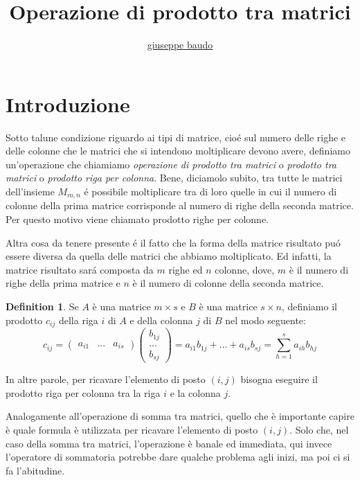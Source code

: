 \documentclass[a4paper,10pt]{article}
\title{Operazione di prodotto tra matrici}
\author{\href{http://www.baudo.hol.es}{giuseppe baudo}}
\begin{document}
	
	\theoremstyle{definition}
	\newtheorem{definition}{Definition}[section]

\maketitle

\section{Introduzione}
Sotto talune condizione riguardo ai tipi di matrice, cio\'{e} sul numero delle righe e delle colonne che le matrici che si intendono moltiplicare devono avere, definiamo un'operazione
che chiamiamo \textit{operazione di prodotto tra matrici} o \textit{prodotto tra matrici} o \textit{prodotto riga per colonna}.
Bene, diciamolo subito, tra tutte le matrici dell'insieme $M_{m,n}$ \'{e} possibile moltiplicare tra di loro quelle in cui il numero di colonne della prima matrice corrisponde al
numero di righe della seconda matrice. Per questo motivo viene chiamato prodotto righe per colonne.

Altra cosa da tenere presente \'{e} il fatto che la forma della matrice risultato pu\'{o} essere diversa da quella delle matrici che abbiamo moltiplicato. Ed infatti, la matrice risultato
sar\'{a} composta da $m$ righe ed $n$ colonne, dove, $m$ \`{e} il numero di righe della prima matrice e $n$ \`{e} il numero di colonne della seconda matrice.

\begin{definition}
 Se $A$ \`{e} una matrice $m \times s$ e $B$ \`{e} una matrice $s \times n$, definiamo il prodotto $c_{ij}$ della riga $i$ di $A$ e della colonna $j$ di $B$ nel modo seguente:
 \[
  c_{ij} = \begin{pmatrix}
	      a_{i1} & ... & a_{is}
           \end{pmatrix}           
           \begin{pmatrix}
	      b_{1j} \\
	      ... \\
	      b_{sj}
           \end{pmatrix}
         = a_{i1}b_{1j} + ... + a_{is}b_{sj}
         = \sum_{h=1}^s a_{ih}b_{hj}
 \]

\end{definition}

In altre parole, per ricavare l'elemento di posto $(i,j)$ bisogna eseguire il prodotto riga per colonna tra la riga $i$ e la colonna $j$.

Analogamente all'operazione di somma tra matrici, quello che \`{e} importante capire \`{e} quale formula \`{e} utilizzata per ricavare l'elemento di posto $(i,j)$. Solo che,
nel caso della somma tra matrici, l'operazione \`{e} banale ed immediata, qui invece l'operatore di sommatoria potrebbe dare qualche problema agli inizi, ma poi ci si fa l'abitudine.
\end{document}
